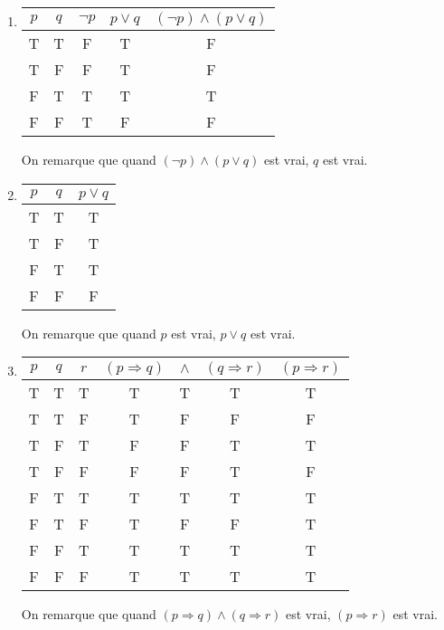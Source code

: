     \begin{enumerate}
    	\item \hspace{1em}

    \begin{center}
	\begin{tabular}{cc|ccc}
		$p$ & $q$ & $\lnot p$ & $p \lor q$ & $(\lnot p) \land (p \lor q)$ \\
		\hline
		T&T&F&T&F\\
		T&F&F&T&F\\
		F&\color{red}T&T&T&\color{red}T\\
		F&F&T&F&F\\
	\end{tabular}
    \end{center}

    On remarque que quand $(\lnot p) \land (p \lor q)$ est vrai, $q$ est vrai.

	\item  \hspace{1em}
    \begin{center}
    	\begin{tabular}{cc|c}
    		$p$ & $q$ & $p \lor q$ \\
    		\hline
    		\color{red}T&T&\color{red}T\\
    		\color{red}T&F&\color{red}T\\
    		F&T&T\\
    		F&F&F\\
    	\end{tabular}
    \end{center}

    On remarque que quand $p$ est vrai, $p \lor q$ est vrai.

	\item  \hspace{1em}
    \begin{center}
    	\begin{tabular}{ccc|cccc}
    		$p$ & $q$ & $r$ & $(p \Rightarrow q)$ & $\land$ & $(q \Rightarrow r)$ & $(p \Rightarrow r)$ \\
    		\hline
    		T&T&T&T&\color{red}T&T&\color{red}T\\
    		T&T&F&T&F&F&F\\
    		T&F&T&F&F&T&T\\
    		T&F&F&F&F&T&F\\
    		F&T&T&T&\color{red}T&T&\color{red}T\\
    		F&T&F&T&F&F&T\\
    		F&F&T&T&\color{red}T&T&\color{red}T\\
    		F&F&F&T&\color{red}T&T&\color{red}T\\
    	\end{tabular}
    \end{center}

    On remarque que quand $(p \Rightarrow q) \land (q \Rightarrow r)$ est vrai, $(p \Rightarrow r)$ est vrai.


\end{enumerate}

